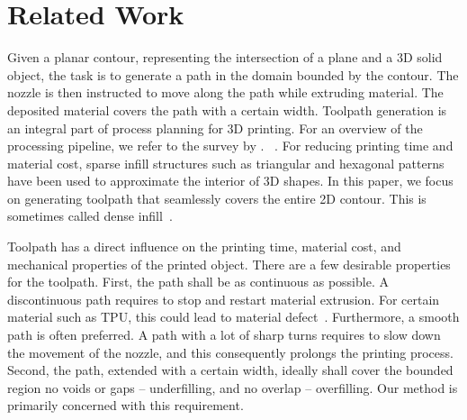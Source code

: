 \section{Related Work}

Given a planar contour, representing the intersection of a plane and a 3D solid object, the task is to generate a path in the domain bounded by the contour.
The nozzle is then instructed to move along the path while extruding material.
The deposited material covers the path with a certain width.
Toolpath generation is an integral part of process planning for 3D printing.
For an overview of the processing pipeline, we refer to the survey by \citeauthor{Livesu2017CGF}.~\cite{Livesu2017CGF} .
For reducing printing time and material cost, sparse infill structures such as triangular and hexagonal patterns have been used to approximate the interior of 3D shapes.
In this paper, we focus on generating toolpath that seamlessly covers the entire 2D contour.
This is sometimes called dense infill~\cite{Livesu2017CGF}.

Toolpath has a direct influence on the printing time, material cost, and mechanical properties of the printed object.
There are a few desirable properties for the toolpath.
First, the path shall be as continuous as possible.
A discontinuous path requires to stop and restart material extrusion. 
For certain material such as TPU, this could lead to material defect~\cite{KUIPERS2019CAD}.
Furthermore, a smooth path is often preferred. A path with a lot of sharp turns requires to slow down the movement of the nozzle, and this consequently prolongs the printing process.
Second, the path, extended with a certain width, ideally shall cover the bounded region no voids or gaps --  underfilling, and no overlap -- overfilling. Our method is primarily concerned with this requirement. 

